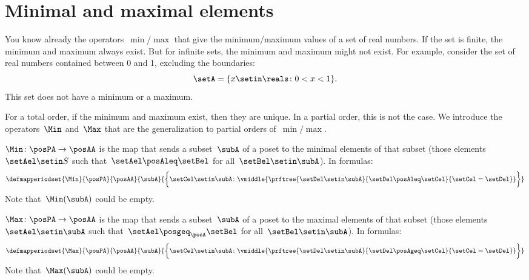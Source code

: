 \section{Minimal and maximal elements}

You know already the operators~$\min$/$\max$ that give the minimum/maximum values of a set of real numbers.
If the set is finite, the minimum and maximum always exist.
But for infinite sets, the minimum and maximum might not exist.
For example, consider the set of real numbers contained between 0 and 1, excluding the boundaries:
\begin{equation}
    \setA = \{ x \setin \reals  \colon 0 < x < 1 \}.
\end{equation}
This set does not have a minimum or a maximum.

For a total order, if the minimum and maximum exist, then they are unique.
In a partial order, this is not the case.
We introduce the operators~$\Min$ and~$\Max$ that are the generalization to partial orders of~$\min/\max$.

\begin{ctdefinition}
    \label{def:Min}
    $\Min \colon \posPA \to \posAA$ is the map that sends a subset~$\subA$ of a poset to the minimal elements of that subset (those elements~$\setAel \setin S$ such that~$\setAel \posAleq \setBel$ for all~$\setBel \setin \subA$).
    In formulas:
    \begin{equation*}
        \defmapperiodset{\Min}{\posPA}{\posAA}{\subA}{\bigg\{
            \setCel\setin \subA\colon
            \vmiddle{
                \prftree{
                    \setDel\setin \subA
                }{
                    \setDel\posAleq \setCel
                }{
                    \setCel=\setDel
                }
            }
            \bigg\}}
    \end{equation*}
    Note that~$\Min(\subA)$ could be empty.
\end{ctdefinition}

\begin{ctdefinition}
    \label{def:Max}
    $\Max \colon \posPA \to \posAA$ is the map that sends a subset~$\subA$ of a poset to the maximal elements of that subset (those elements~$\setAel \setin \subA$ such that~$\setAel \posgeq_\posA \setBel$ for all~$\setBel \setin \subA$).
    In formulas:
    \begin{equation*}
        \defmapperiodset{
            \Max
        }{
            \posPA
        }{
            \posAA
        }{
            \subA
        }{
            \bigg\{
            \setCel\setin \subA\colon
            \vmiddle{
                \prftree{
                    \setDel\setin \subA
                }{
                    \setDel\posAgeq \setCel
                }{
                    \setCel=\setDel
                }
            }
            \bigg\}
        }
    \end{equation*}
    Note that~$\Max(\subA)$ could be empty.
\end{ctdefinition}

